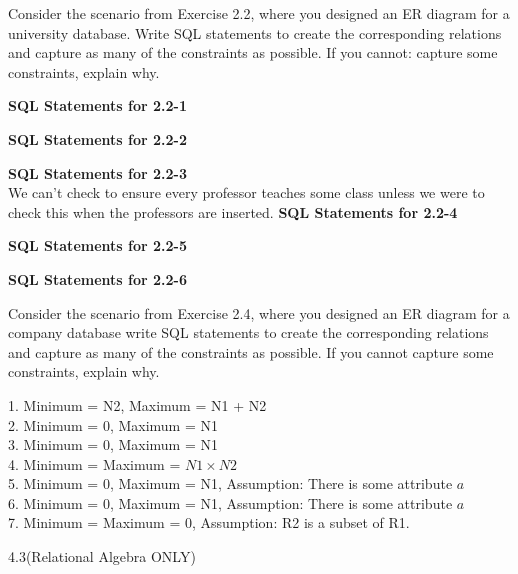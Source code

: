 




\homeworkheader{\classnameandsection}

\begin{problem}{3.12}
  Consider the scenario from Exercise 2.2, where you designed an ER diagram for a university database. Write SQL
  statements to create the corresponding relations and capture as many of the constraints as possible. If you cannot:
  capture some constraints, explain why.
  \begin{solution}
    \textbf{SQL Statements for 2.2-1}
    
    \textbf{SQL Statements for 2.2-2}
    
    \textbf{SQL Statements for 2.2-3} \\
    We can't check to ensure every professor teaches some class unless we were to check this when the professors are
    inserted.
    \br
    \textbf{SQL Statements for 2.2-4}
    
    \textbf{SQL Statements for 2.2-5}
    
    \textbf{SQL Statements for 2.2-6}
    
  \end{solution}
\end{problem}

\begin{problem}{3.14}
  Consider the scenario from Exercise 2.4, where you designed an ER diagram for a company database write SQL statements
  to create the corresponding relations and capture as many of the constraints as possible. If you cannot capture some
  constraints, explain why.
  \begin{solution}
    
  \end{solution}
\end{problem}

\begin{problem}{4.2}
  \begin{solution}
    1. Minimum = N2, Maximum = N1 + N2 \\
    2. Minimum = 0, Maximum = N1 \\
    3. Minimum = 0, Maximum = N1 \\
    4. Minimum = Maximum = $N1 \times N2$ \\
    5. Minimum = 0, Maximum = N1, Assumption: There is some attribute $a$ \\
    6. Minimum = 0, Maximum = N1, Assumption: There is some attribute $a$ \\
    7. Minimum = Maximum = 0, Assumption: R2 is a subset of R1.
  \end{solution}
\end{problem}

\begin{problem}{4.3(Relational Algebra ONLY)}
\end{problem}

\begin{problem}{4.4}
\end{problem}

\begin{problem}{5.2}
\end{problem}

\begin{problem}{5.4}
\end{problem}


